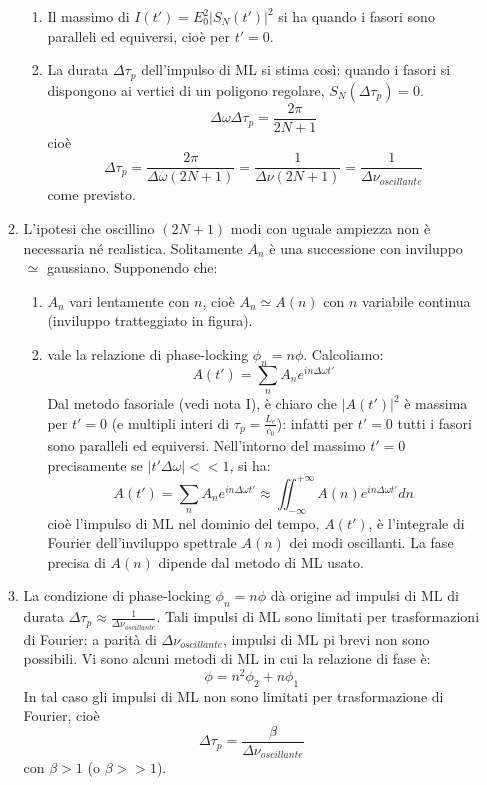 \documentclass{book}
\def \w {\omega}
\def \D {\Delta}
\def \iintinf {\iint_{-\infty}^{+\infty}}
\theoremstyle{remark}
\begin{document}
\begin{enumerate}
\begin{enumerate}
\begin{enumerate}
\item Il massimo di $I(t') = E_0^2 \left|S_N(t')\right|^2$ si ha quando i fasori sono paralleli ed equiversi, cioè per $t'=0$.
\item La durata $\D\tau_p$ dell'impulso di ML si stima così: quando i fasori si dispongono ai vertici di un poligono regolare, $S_N(\D\tau_p) = 0$.
\begin{equation*}
\D\omega \D\tau_p = \frac{2\pi}{2N+1}
\end{equation*}
cioè
\begin{equation*}
\D\tau_p = \frac{2\pi}{\D\omega (2N+1)} = \frac{1}{\D\nu(2N+1)} = \frac{1}{\D\nu_{oscillante}}
\end{equation*}
come previsto.
\end{enumerate}

\item L'ipotesi che oscillino $(2N+1)$ modi con uguale ampiezza non è necessaria né realistica. Solitamente $A_n$ è una successione con inviluppo $\simeq$ gaussiano.
Supponendo che:
\begin{enumerate}
\item $A_n$ vari lentamente con $n$, cioè $A_n \simeq A(n)$ con $n$ variabile continua (inviluppo tratteggiato in figura).
\item vale la relazione di phase-locking $\phi_n = n\phi$.
Calcoliamo:
\begin{equation*}
A(t') = \sum_n A_n e^{in\D\omega t'}
\end{equation*}
Dal metodo fasoriale (vedi nota I), è chiaro che $|A(t')|^2$ è massima per $t'=0$ (e multipli interi di $\tau_p = \frac{L_e}{c_0}$): infatti per $t'=0$ tutti i fasori sono paralleli ed equiversi.
Nell'intorno del massimo $t'=0$ precisamente se $|t'\D\w| << 1$, si ha:
\begin{equation*}
A(t') = \sum_n A_n e^{in\D\omega t'} \approx \iintinf A(n) e^{in\D\omega t'} dn
\end{equation*}
cioè l'impulso di ML nel dominio del tempo, $A(t')$, è l'integrale di Fourier dell'inviluppo spettrale $A(n)$ dei modi oscillanti. La fase precisa di $A(n)$ dipende dal metodo di ML usato.
\end{enumerate}

\item La condizione di phase-locking $\phi_n=n\phi$ dà origine ad impulsi di ML di durata $\D\tau_p \approx \frac{1}{\D\nu_{oscillante}}$.
Tali impulsi di ML sono limitati per trasformazioni di Fourier: a parità di $\D\nu_{oscillante}$, impulsi di ML pi brevi non sono possibili. Vi sono alcuni metodi di ML in cui la relazione di fase è:
\begin{equation*}
\phi = n^2\phi_2 + n \phi_1
\end{equation*}
In tal caso gli impulsi di ML non sono limitati per trasformazione di Fourier, cioè
\begin{equation*}
\D\tau_p = \frac{\beta}{\D\nu_{oscillante}}
\end{equation*}
con $\beta>1$ (o $\beta >> 1$).


\end{enumerate}
\end{enumerate}
\end{document}
